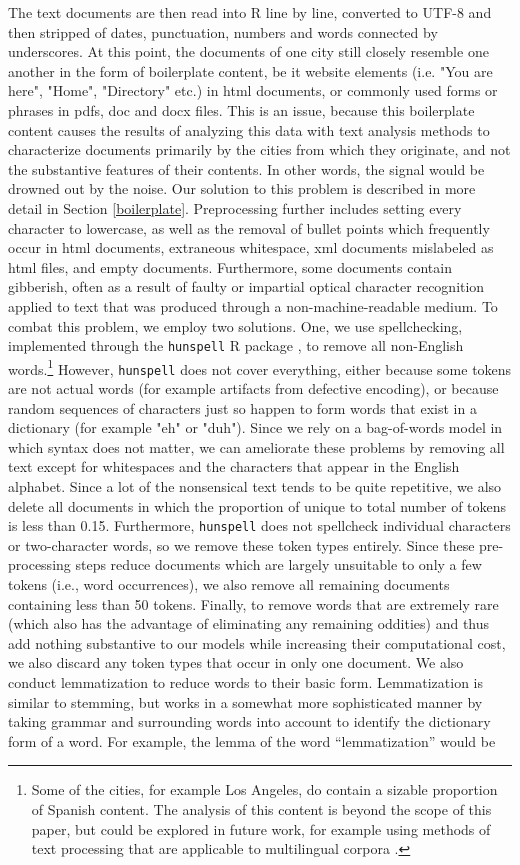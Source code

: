 \documentclass[11pt]{article}
\begin{document}
The text documents are then read into R line by line, converted to UTF-8 and then stripped of dates, punctuation, numbers and words connected by underscores. At this point, the documents of one city still closely resemble one another in the form of boilerplate content, be it website elements (i.e. "You are here", "Home", "Directory" etc.) in html documents, or commonly used forms or phrases in pdfs, doc and docx files. This is an issue, because this boilerplate content causes the results of analyzing this data with text analysis methods to characterize documents primarily by the cities from which they originate, and not the substantive features of their contents. In other words, the signal would be drowned out by the noise. Our solution to this problem is described in more detail in Section \ref{boilerplate}.
Preprocessing further includes setting every character to lowercase, as well as the removal of bullet points which frequently occur in html documents, extraneous whitespace, xml documents mislabeled as html files, and empty documents. Furthermore, some documents contain gibberish, often as a result of faulty or impartial optical character recognition applied to text that was produced through a non-machine-readable medium. To combat this problem, we employ two solutions. One, we use spellchecking, implemented through the \texttt{hunspell} R package \citep{hunspell}, to remove all non-English words.\footnote{Some of the cities, for example Los Angeles, do contain a sizable proportion of Spanish content. The analysis of this content is beyond the scope of this paper, but could be explored in future work, for example using methods of text processing that are applicable to multilingual corpora \citep{lucas2015computer}. } However, \texttt{hunspell} does not cover everything, either because some tokens are not actual words (for example artifacts from defective encoding), or because random sequences of characters just so happen to form words that exist in a dictionary (for example "eh" or "duh"). Since we rely on a bag-of-words model in which syntax does not matter, we can ameliorate these problems by removing all text except for whitespaces and the characters that appear in the English alphabet. Since a lot of the nonsensical text tends to be quite repetitive, we also delete all documents in which the proportion of unique to total number of tokens is less than 0.15. Furthermore, \texttt{hunspell} does not spellcheck individual characters or two-character words, so we remove these token types entirely. Since these pre-processing steps reduce documents which are largely unsuitable to only a few tokens (i.e., word occurrences), we also remove all remaining documents containing less than 50 tokens. Finally, to remove words that are extremely rare (which also has the advantage of eliminating any remaining oddities) and thus add nothing substantive to our models while increasing their computational cost, we also discard any token types that occur in only one document. We also conduct lemmatization to reduce words to their basic form. Lemmatization is similar to stemming, but works in a somewhat more sophisticated manner by taking grammar and surrounding words into account to identify the dictionary form of a word. For example, the lemma of the word ``lemmatization'' would be 
\end{document}
